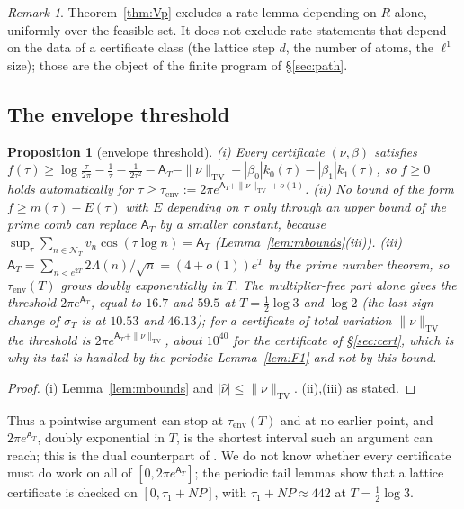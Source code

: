 \documentclass[11pt]{amsart}
\newtheorem{proposition}[theorem]{Proposition}
\theoremstyle{definition}
\theoremstyle{remark}
\newtheorem{remark}[theorem]{Remark}
\newcommand{\TV}{\operatorname{TV}}
\newcommand{\sT}{\sigma_T}
\newcommand{\nuh}{\widehat\nu}
\newcommand{\NT}{\mathcal N_T}
\newcommand{\Aconst}{\mathsf A_T}
\begin{document}
\begin{remark}
Theorem~\ref{thm:Vp} excludes a rate lemma depending on $R$ alone, uniformly over the feasible
set. It does not exclude rate statements that depend on the data of a certificate class (the
lattice step $d$, the number of atoms, the $\ell^1$ size); those are the object of the finite
program of \S\ref{sec:path}.
\end{remark}

\subsection{The envelope threshold}

\begin{proposition}[envelope threshold]\label{prop:env}
\emph{(i)} Every certificate $(\nu,\beta)$ satisfies $f(\tau)\ge\log\frac\tau{2\pi}-\frac1\tau-\frac1{2\tau^2}-\Aconst-\|\nu\|_{\TV}-|\beta_0|k_0(\tau)-|\beta_1|k_1(\tau)$,
so $f\ge0$ holds automatically for $\tau\ge\tau_{\mathrm{env}}:=2\pi e^{\Aconst+\|\nu\|_{\TV}+o(1)}$.
\emph{(ii)} No bound of the form $f\ge m(\tau)-E(\tau)$ with $E$ depending on $\tau$ only through
an upper bound of the prime comb can replace $\Aconst$ by a smaller constant, because
$\sup_\tau\sum_{n\in\NT}v_n\cos(\tau\log n)=\Aconst$ (Lemma~\ref{lem:mbounds}(iii)).
\emph{(iii)} $\Aconst=\sum_{n<e^{2T}}2\Lambda(n)/\sqrt n=(4+o(1))e^{T}$ by the prime number theorem,
so $\tau_{\mathrm{env}}(T)$ grows doubly exponentially in $T$. The multiplier-free part alone gives
the threshold $2\pi e^{\Aconst}$, equal to $16.7$ and $59.5$ at $T=\frac12\log3$ and $\log2$ (the last
sign change of $\sT$ is at $10.53$ and $46.13$); for a certificate of total variation $\|\nu\|_{\TV}$
the threshold is $2\pi e^{\Aconst+\|\nu\|_{\TV}}$, about $10^{40}$ for the certificate of
\S\ref{sec:cert}, which is why its tail is handled by the periodic Lemma~\ref{lem:F1} and not by this
bound.
\end{proposition}
\begin{proof}
(i) Lemma~\ref{lem:mbounds} and $|\nuh|\le\|\nu\|_{\TV}$. (ii),(iii) as stated.
\end{proof}

Thus a pointwise argument can stop at $\tau_{\mathrm{env}}(T)$ and at no earlier point, and
$2\pi e^{\Aconst}$, doubly exponential in $T$, is the shortest interval such an argument can
reach; this is the dual counterpart of \cite[Thm.~1.4]{Zhu2026}. We do not know whether every
certificate must do work on all of $[0,2\pi e^{\Aconst}]$; the periodic tail lemmas show that a
lattice certificate is checked on $[0,\tau_1+NP]$, with $\tau_1+NP\approx442$ at $T=\frac12\log3$.
\end{document}
